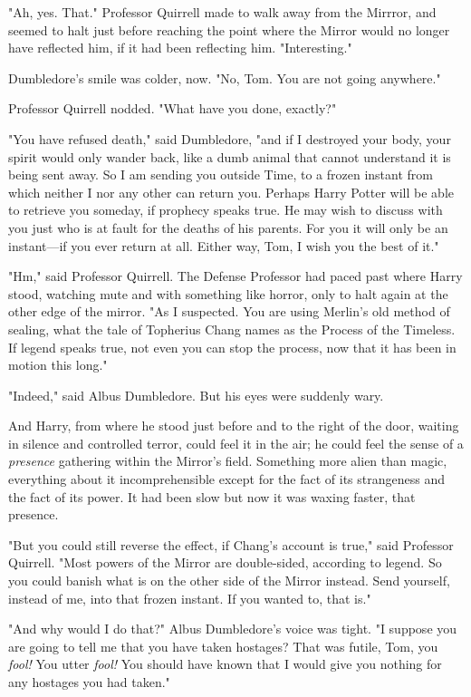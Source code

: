"Ah, yes. That." Professor Quirrell made to walk away from the Mirrror, and
seemed to halt just before reaching the point where the Mirror would no longer
have reflected him, if it had been reflecting him. "Interesting."

Dumbledore's smile was colder, now. "No, Tom. You are not going anywhere."

Professor Quirrell nodded. "What have you done, exactly?"

"You have refused death," said Dumbledore, "and if I destroyed your body, your
spirit would only wander back, like a dumb animal that cannot understand it is
being sent away. So I am sending you outside Time, to a frozen instant from
which neither I nor any other can return you. Perhaps Harry Potter will be able
to retrieve you someday, if prophecy speaks true. He may wish to discuss with
you just who is at fault for the deaths of his parents. For you it will only be
an instant---if you ever return at all. Either way, Tom, I wish you the best of
it."

"Hm," said Professor Quirrell. The Defense Professor had paced past where Harry
stood, watching mute and with something like horror, only to halt again at the
other edge of the mirror. "As I suspected. You are using Merlin's old method of
sealing, what the tale of Topherius Chang names as the Process of the Timeless.
If legend speaks true, not even you can stop the process, now that it has been
in motion this long."

"Indeed," said Albus Dumbledore. But his eyes were suddenly wary.

And Harry, from where he stood just before and to the right of the door,
waiting in silence and controlled terror, could feel it in the air; he could
feel the sense of a \emph{presence} gathering within the Mirror's field.
Something more alien than magic, everything about it incomprehensible except
for the fact of its strangeness and the fact of its power. It had been slow but
now it was waxing faster, that presence.

"But you could still reverse the effect, if Chang's account is true," said
Professor Quirrell. "Most powers of the Mirror are double-sided, according to
legend. So you could banish what is on the other side of the Mirror instead.
Send yourself, instead of me, into that frozen instant. If you wanted to, that
is."

"And why would I do that?" Albus Dumbledore's voice was tight. "I suppose you
are going to tell me that you have taken hostages? That was futile, Tom, you
\emph{fool!} You utter \emph{fool!} You should have known that I would give you
nothing for any hostages you had taken."

